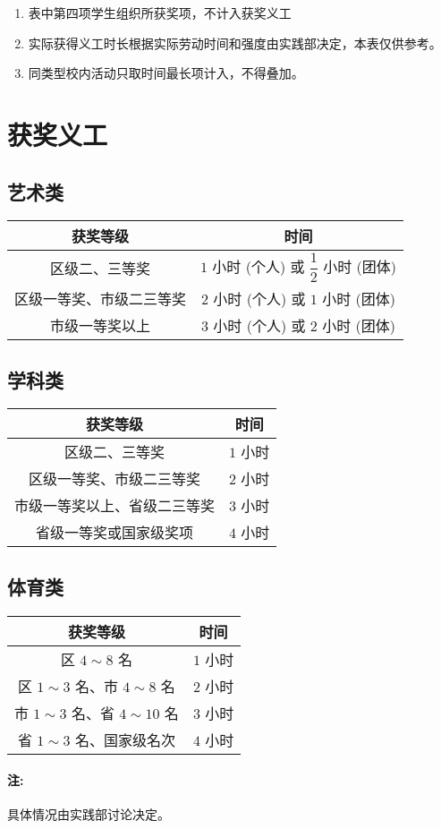 \documentclass{article}
\begin{document}
\begin{enumerate}
  \item 表中第四项学生组织所获奖项，不计入获奖义工
  \item 实际获得义工时长根据实际劳动时间和强度由实践部决定，本表仅供参考。
  \item 同类型校内活动只取时间最长项计入，不得叠加。
\end{enumerate}

\section{获奖义工}

\subsection{艺术类}

\begin{tabular}{cc}
  \hline
  \textbf{获奖等级} & \textbf{时间} \\
  \hline
  区级二、三等奖 & $1$ 小时 (个人) 或 $\dfrac12$ 小时 (团体) \\
  区级一等奖、市级二三等奖 & $2$ 小时 (个人) 或 $1$ 小时 (团体) \\
  市级一等奖以上 & $3$ 小时 (个人) 或 $2$ 小时 (团体) \\
  \hline
\end{tabular}

\subsection{学科类}

\begin{tabular}{cc}
  \hline
  \textbf{获奖等级} & \textbf{时间} \\
  \hline
  区级二、三等奖 & $1$ 小时 \\
  区级一等奖、市级二三等奖 & $2$ 小时 \\
  市级一等奖以上、省级二三等奖 & $3$ 小时 \\
  省级一等奖或国家级奖项 & $4$ 小时 \\
  \hline
\end{tabular}

\subsection{体育类}

\begin{tabular}{cc}
  \hline
  \textbf{获奖等级} & \textbf{时间} \\
  \hline
  区 $4\sim8$ 名 & $1$ 小时 \\
  区 $1\sim3$ 名、市 $4\sim8$ 名 & $2$ 小时 \\
  市 $1\sim3$ 名、省 $4\sim10$ 名 & $3$ 小时 \\
  省 $1\sim3$ 名、国家级名次 & $4$ 小时 \\
  \hline
\end{tabular}

\paragraph{注:}

具体情况由实践部讨论决定。
\end{document}
